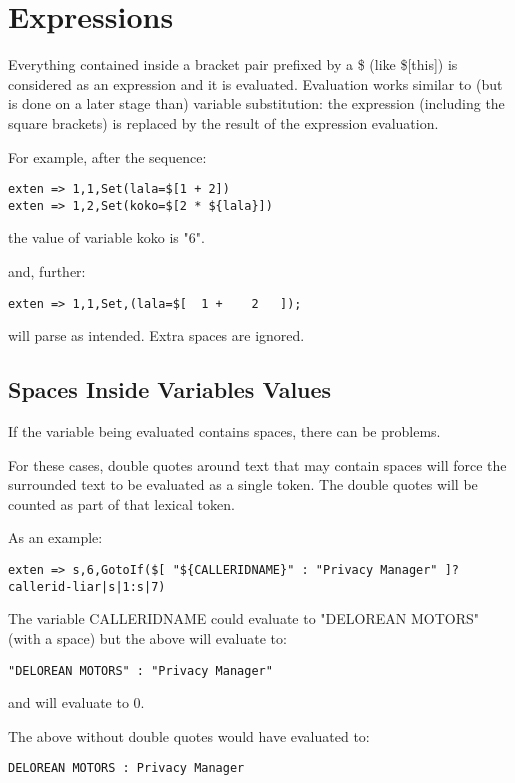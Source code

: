 \section{Expressions} 

Everything contained inside a bracket pair prefixed by a \$ (like \$[this]) is 
considered as an expression and it is evaluated. Evaluation works similar to 
(but is done on a later stage than) variable substitution: the expression 
(including the square brackets) is replaced by the result of the expression 
evaluation. 

For example, after the sequence:
\begin{verbatim}
exten => 1,1,Set(lala=$[1 + 2])
exten => 1,2,Set(koko=$[2 * ${lala}])
\end{verbatim}
the value of variable koko is "6".

and, further:
\begin{verbatim}
exten => 1,1,Set,(lala=$[  1 +    2   ]);
\end{verbatim}
will parse as intended. Extra spaces are ignored.


\subsection{Spaces Inside Variables Values}

If the variable being evaluated contains spaces, there can be problems.

For these cases, double quotes around text that may contain spaces
will force the surrounded text to be evaluated as a single token.
The double quotes will be counted as part of that lexical token.

As an example:

\begin{verbatim}
exten => s,6,GotoIf($[ "${CALLERIDNAME}" : "Privacy Manager" ]?callerid-liar|s|1:s|7)
\end{verbatim}

The variable CALLERIDNAME could evaluate to "DELOREAN MOTORS" (with a space)
but the above will evaluate to:

\begin{verbatim}
"DELOREAN MOTORS" : "Privacy Manager"
\end{verbatim}

and will evaluate to 0.

The above without double quotes would have evaluated to:

\begin{verbatim}
DELOREAN MOTORS : Privacy Manager
\end{verbatim}

